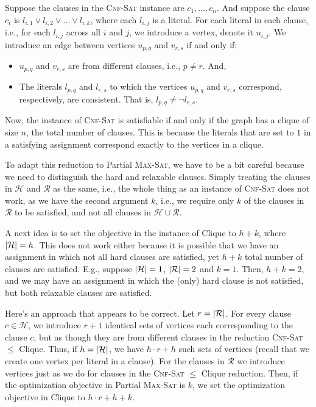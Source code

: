 \documentclass[11pt,onecolumn]{article}
\newcommand{\size}[1]{\ensuremath{\left|#1\right|}\xspace}
\let\originalleft\left
\let\originalright\right
\renewcommand{\left}{\mathopen{}\mathclose\bgroup\originalleft}
\renewcommand{\right}{\aftergroup\egroup\originalright}
\begin{document}
\vspace*{0.125in}
\noindent
Suppose the clauses in the \textsc{Cnf-Sat} instance are $c_1, \ldots, c_n$. And suppose the clause $c_i$ is $l_{i,1} \vee l_{i,2} \vee \ldots \vee l_{i,k}$, where each $l_{i,j}$ is a literal. For each literal in each clause, i.e., for each $l_{i,j}$ across all $i$ and $j$, we introduce a vertex, denote it $u_{i,j}$. We introduce an edge between vertices $u_{p,q}$ and $v_{r,s}$ if and only if:
\begin{itemize}
\item $u_{p,q}$ and $v_{r,s}$ are from different clauses, i.e., $p\not= r$. And,
\item The literals $l_{p,q}$ and $l_{r,s}$ to which the vertices $u_{p,q}$ and $v_{r,s}$ correspond, respectively, are consistent. That is, $l_{p,q} \not= \neg l_{r,s}$.
\end{itemize}

\vspace*{0.125in}
\noindent
Now, the instance of \textsc{Cnf-Sat} is satisfiable if and only if the graph has a clique of size $n$, the total number of clauses. This is because the literals that are set to $1$ in a satisfying assignment correspond exactly to the vertices in a clique.

\vspace*{0.125in}
\noindent
To adapt this reduction to Partial \textsc{Max-Sat}, we have to be a bit careful because we need to distinguish the hard and relaxable clauses. Simply treating the clauses in $\mathcal{H}$ and $\mathcal{R}$ as the same, i.e., the whole thing as an instance of \textsc{Cnf-Sat} does not work, as we have the second argument $k$, i.e., we require only $k$ of the clauses in $\mathcal{R}$ to be satisfied, and not all clauses in $\mathcal{H}\cup\mathcal{R}$.

\vspace*{0.125in}
\noindent
A next idea is to set the objective in the instance of Clique to $h + k$, where $\size{\mathcal{H}} = h$. This does not work either because it is possible that we have an assignment in which not all hard clauses are satisfied, yet $h+k$ total number of clauses are satisfied. E.g., suppose $\size{\mathcal{H}} = 1$, $\size{\mathcal{R}} = 2$ and $k = 1$. Then, $h+k = 2$, and we may have an assignment in which the (only) hard clause is not satisfied, but both relaxable clauses are satisfied.

\vspace*{0.125in}
\noindent
Here's an approach that appears to be correct. Let $r = \size{\mathcal{R}}$. For every clause $c\in\mathcal{H}$, we introduce $r + 1$ identical sets of vertices each corresponding to the clause $c$, but as though they are from different clauses in the reduction \textsc{Cnf-Sat} $\le$ Clique. Thus, if $h = \size{\mathcal{H}}$, we have $h\cdot r + h$ such sets of vertices (recall that we create one vertex per literal in a clause). For the clauses in $\mathcal{R}$ we introduce vertices just as we do for clauses in the \textsc{Cnf-Sat} $\le$ Clique reduction. Then, if the optimization objective in Partial \textsc{Max-Sat} is $k$, we set the optimization objective in Clique to $h\cdot r + h + k$.
\end{document}

